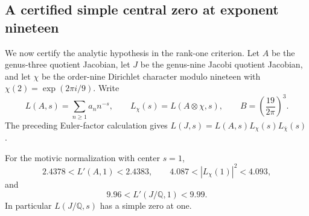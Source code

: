 \subsection{A certified simple central zero at exponent nineteen}
\label{subsec:nineteen-certificate}

We now certify the analytic hypothesis in the rank-one criterion.
Let $A$ be the genus-three quotient Jacobian, let $J$ be the
genus-nine Jacobi quotient Jacobian, and let $\chi$ be the order-nine
Dirichlet character modulo nineteen with $\chi(2)=\exp(2\pi i/9)$.
Write
\[
 L(A,s)=\sum_{n\geq1}a_n n^{-s},\qquad
 L_\chi(s)=L(A\otimes\chi,s),\qquad
 B=\left(\frac{19}{2\pi}\right)^3.
\]
The preceding Euler-factor calculation gives
$L(J,s)=L(A,s)L_\chi(s)L_{\bar\chi}(s)$.

\begin{proposition}
\label{prop:nineteen-analytic-certificate}
For the motivic normalization with center $s=1$,
\[
 2.4378<L'(A,1)<2.4383,\qquad
 4.087<|L_\chi(1)|^2<4.093,
\]
and
\[
 9.96<L'(J/\mathbb Q,1)<9.99.
\]
In particular $L(J/\mathbb Q,s)$ has a simple zero at one.
\end{proposition}

